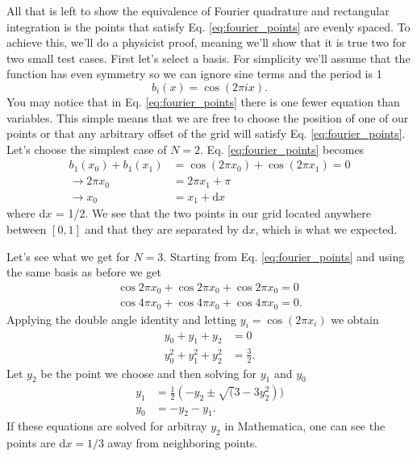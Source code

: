 \documentclass[preprint, amsmath, amssymb]{revtex4-1}
\begin{document}
  All that is left to show the equivalence of Fourier quadrature and rectangular integration is the points that satisfy Eq. \ref{eq:fourier_points} are evenly spaced. To achieve this, we'll do a physicist proof, meaning we'll show that it is true two for two small test cases.
  First let's select a basis. For simplicity we'll assume that the function has even symmetry so we can ignore sine terms and the period is 1
  \begin{equation}
    b_i(x) = \cos(2 \pi i x).
  \end{equation}
  You may notice that in Eq. \ref{eq:fourier_points} there is one fewer equation than variables. This simple means that we are free to choose the position of one of our points or that any arbitrary offset of the grid will satisfy Eq. \ref{eq:fourier_points}. Let's choose the simplest case of $N = 2$. Eq. \ref{eq:fourier_points} becomes
  \begin{align*}
    b_1(x_0) + b_1(x_1) &= \cos(2 \pi x_0) + \cos(2 \pi x_1)  = 0\\
    \rightarrow 2 \pi x_0 &= 2 \pi x_1 + \pi \\
    \rightarrow x_0 &= x_1 + \text{d}x
  \end{align*}
  where d$x$ = 1/2. We see that the two points in our grid located anywhere between $[0, 1]$ and that they are separated by d$x$, which is what we expected.

  Let's see what we get for $N = 3$. Starting from Eq. \ref{eq:fourier_points} and using the same basis as before we get
  \begin{align*}
    \cos{2 \pi x_0} + \cos{2 \pi x_0} + \cos{2 \pi x_0} = 0 \\
    \cos{4 \pi x_0} + \cos{4 \pi x_0} + \cos{4 \pi x_0} = 0.
  \end{align*}
  Applying the double angle identity and letting $y_i = \cos(2 \pi x_i)$ we obtain
  \begin{align*}
    y_0 + y_1 + y_2 &= 0 \\
    y_0^2 + y_1^2 + y_2^2 &= \frac{3}{2}.
  \end{align*}
  Let $y_2$ be the point we choose and then solving for $y_1$ and $y_0$
  \begin{align*}
    y_1 &= \frac{1}{2}(-y_2 \pm \sqrt(3 - 3y_2^2)) \\
    y_0 &= -y_2 - y_1.
  \end{align*}
  If these equations are solved for arbitray $y_2$ in Mathematica, one can see the points are d$x = 1/3$ away from neighboring points.
 
{}

\end{document}
